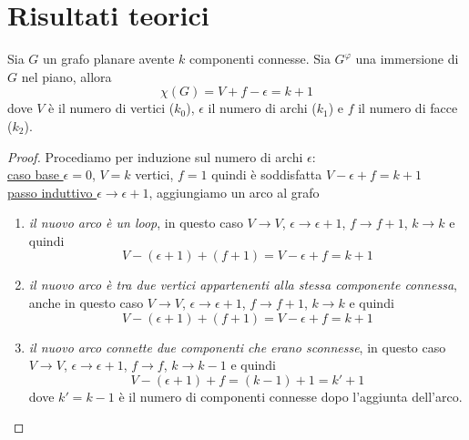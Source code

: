 \chapter{Risultati teorici}

\begin{teorema}\label{eulero-generica}
    Sia \(G\) un grafo planare avente \(k\) componenti connesse. Sia \(G^\varphi\) una immersione di \(G\) nel piano, allora
    \begin{equation}
        \chi(G)=V+f-\epsilon = k+1
    \end{equation}
    dove \(V\) è il numero di vertici (\(k_0\)), \(\epsilon\) il numero di archi (\(k_1\)) e \(f\) il numero di facce (\(k_2\)).
    \begin{proof}
        Procediamo per induzione sul numero di archi \( \epsilon \): \smallskip \\
        \underline{caso base \(\epsilon=0\)}, \(V=k\) vertici, \(f=1\) quindi è soddisfatta \(V-\epsilon+f = k+1\)\smallskip \\
        \underline{passo induttivo \(\epsilon \to \epsilon + 1\)}, aggiungiamo un arco al grafo
        \begin{enumerate}
            \item \textit{il nuovo arco è un loop}, in questo caso \(V \to V\), \(\epsilon \to \epsilon +1\), \(f \to f+1\), \(k \to k\) e quindi
                  \begin{equation}
                      V-(\epsilon+1)+(f+1)=V-\epsilon+f=k+1
                  \end{equation}
            \item \textit{il nuovo arco è tra due vertici appartenenti alla stessa componente connessa}, anche in questo caso \(V \to V\), \(\epsilon \to \epsilon +1\), \(f \to f+1\), \(k \to k\) e quindi
                  \begin{equation}
                      V-(\epsilon+1)+(f+1)=V-\epsilon+f=k+1
                  \end{equation}
            \item \textit{il nuovo arco connette due componenti che erano sconnesse}, in questo caso \(V \to V\), \(\epsilon \to \epsilon +1\), \(f \to f\), \(k \to k-1\) e quindi
                  \begin{equation}
                      V-(\epsilon +1)+f = (k-1) + 1 = k'+1
                  \end{equation}
                  dove \(k'=k-1\) è il numero di componenti connesse dopo l'aggiunta dell'arco.
        \end{enumerate}
    \end{proof}
\end{teorema}

